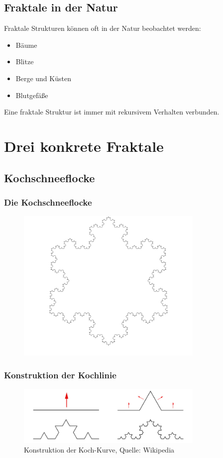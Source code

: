 \documentclass[unknownkeysallowed]{beamer}
\begin{document}
\subsection{Fraktale in der Natur}
\begin{frame}
  Fraktale Strukturen können oft in der Natur beobachtet werden:
  \begin{itemize}
    \item Bäume
    \item Blitze
    \item Berge und Küsten
    \item Blutgefäße
  \end{itemize}
  \vspace{5mm} %
  Eine fraktale Struktur ist immer mit rekursivem Verhalten verbunden.
\end{frame}


\section{Drei konkrete Fraktale}

\subsection{Kochschneeflocke}
\begin{frame}
  \frametitle{Die Kochschneeflocke}
  \begin{figure}[ht]
    \centering
    \includegraphics[width=0.8\textwidth]{images/fractal-koch.png}
  \end{figure}
\end{frame}

\begin{frame}
  \frametitle{Konstruktion der Kochlinie}
  \begin{figure}[ht]
    \centering
    \includegraphics[width=0.8\textwidth]{images/how-to-koch.jpg}
    \caption{Konstruktion der Koch-Kurve, Quelle: Wikipedia}
  \end{figure}
\end{frame}
\end{document}
